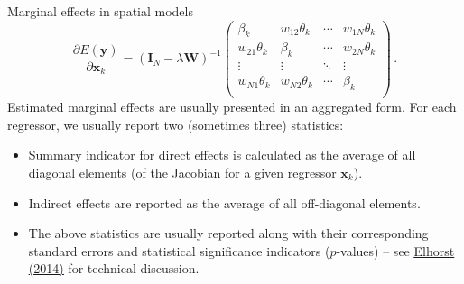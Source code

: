 \documentclass{beamer}
\begin{document}
\begin{frame}{Marginal effects in spatial models}
\begin{equation*}
\frac{\partial E(\bm{y})}{\partial \bm{x}_k}
    =(\bm{I}_N - \lambda \bm{W})^{-1}
	\begin{pmatrix}
		\beta_{k} & w_{12}\theta_{k}& \cdots & w_{1N}\theta_{k}\\
		w_{21}\theta_{k}& \beta_{k} & \cdots & w_{2N}\theta_{k}\\
		\vdots & \vdots & \ddots & \vdots \\
		w_{N1}\theta_{k} & w_{N2}\theta_{k} & \cdots & \beta_{k} \\
	\end{pmatrix}\,. 
\end{equation*}
Estimated marginal effects are usually presented in an aggregated form. For each regressor, we usually report two (sometimes three) statistics:
 \begin{itemize}
    \item Summary indicator for direct effects is calculated as the average of all diagonal elements (of the Jacobian for a given regressor $\bm{x}_k$). 
    \medskip
    \item Indirect effects are reported as the average of all off-diagonal elements. 
    \medskip
    \item The above statistics are usually reported along with their corresponding standard errors and statistical significance indicators ($p$-values) -- see \textcolor{blue}{\underline{\href{http://www.springer.com/cda/content/document/cda_downloaddocument/9783642403392-c2.pdf}{Elhorst (2014)}}} for technical discussion.
\end{itemize}	
\end{frame}
\end{document}
